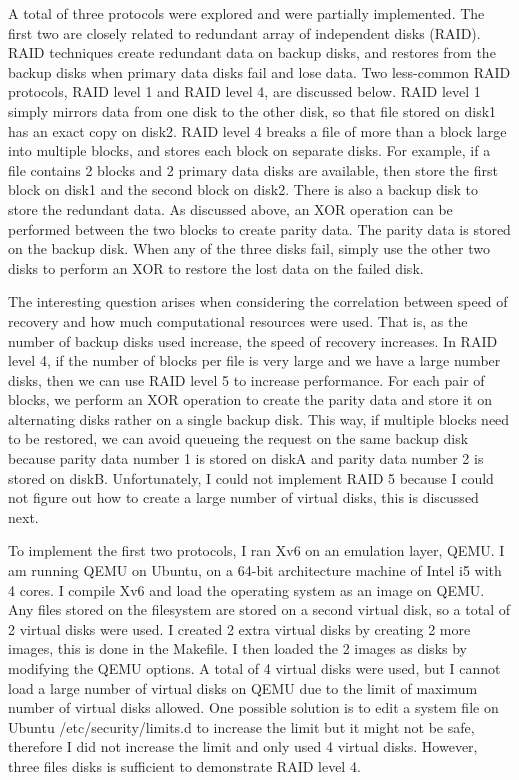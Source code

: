 A total of three protocols were explored and were partially implemented. The first two are closely related to redundant array of independent disks (RAID). RAID techniques create redundant data on backup disks, and restores from the backup disks when primary data disks fail and lose data. Two less-common RAID protocols, RAID level 1 and RAID level 4, are discussed below. RAID level 1 simply mirrors data from one disk to the other disk, so that file stored on disk1 has an exact copy on disk2. RAID level 4 breaks a file of more than a block large into multiple blocks, and stores each block on separate disks. For example, if a file contains 2 blocks and 2 primary data disks are available, then store the first block on disk1 and the second block on disk2. There is also a backup disk to store the redundant data. As discussed above, an XOR operation can be performed between the two blocks to create parity data. The parity data is stored on the backup disk. When any of the three disks fail, simply use the other two disks to perform an XOR to restore the lost data on the failed disk. 

The interesting question arises when considering the correlation between speed of recovery and how much computational resources were used. That is, as the number of backup disks used increase, the speed of recovery increases. In RAID level 4, if the number of blocks per file is very large and we have a large number disks, then we can use RAID level 5 to increase performance. For each pair of blocks, we perform an XOR operation to create the parity data and store it on alternating disks rather on a single backup disk. This way, if multiple blocks need to be restored, we can avoid queueing the request on the same backup disk because parity data number 1 is stored on diskA and parity data number 2 is stored on diskB. Unfortunately, I could not implement RAID 5 because I could not figure out how to create a large number of virtual disks, this is discussed next.   

To implement the first two protocols, I ran Xv6 on an emulation layer, QEMU. I am running QEMU on  Ubuntu, on a 64-bit architecture machine of Intel i5 with 4 cores. I compile Xv6 and load the operating system as an image on QEMU. Any files stored on the filesystem are stored on a second virtual disk, so a total of 2 virtual disks were used. I created 2 extra virtual disks by creating 2 more images, this is done in the Makefile. I then loaded the 2 images as disks by modifying the QEMU options. A total of 4 virtual disks were used, but I cannot load a large number of virtual disks on QEMU due to the limit of maximum number of virtual disks allowed. One possible solution is to edit a system file on Ubuntu /etc/security/limits.d to increase the limit but it might not be safe, therefore I did not increase the limit and only used 4 virtual disks. However, three files disks is sufficient to demonstrate RAID level 4.

